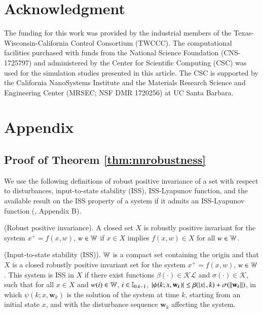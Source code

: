 \documentclass[preprint,5p, twocolumn, authoryear]{elsarticle}
\begin{document}
\section*{Acknowledgment}
The funding for this work was provided by the industrial members of the
Texas-Wisconsin-California Control Consortium (TWCCC). The computational
facilities purchased with funds from the National Science Foundation
(CNS-1725797) and administered by the Center for Scientific Computing (CSC) was
used for the simulation studies presented in this article. The CSC is supported
by the California NanoSystems Institute and the Materials Research Science and
Engineering Center (MRSEC; NSF DMR 1720256) at UC Santa Barbara.




\section*{Appendix}
\renewcommand{\thesubsection}{\Alph{subsection}}

\subsection{Proof of Theorem \ref{thm:nnrobustness}} \label{app:theorem1}

We use the following definitions of robust positive invariance of a set with
respect to disturbances, input-to-state stability (ISS), ISS-Lyapunov function,
and the available result on the ISS property of a system if it admits an
ISS-Lyapunov function (\cite*{jiang:wang:2001, rawlings:mayne:diehl:2017},
Appendix B).

\begin{definition} \label{def:robust_pos_invariance} (Robust positive
invariance). A closed set $X$ is robustly positive invariant for the system $x^+
= f(x, w)$, $w \in \mathbb{W}$ if $x \in X$ implies $f(x, w) \in X$ for all $w \in
\mathbb{W}$.
\end{definition}

\begin{definition} \label{def:iss} (Input-to-state stability (ISS)). $\mathbb{W}$ is a
compact set containing the origin and that $X$ is a closed robustly positive
invariant set for the system $x^+ = f(x, w)$, $w \in \mathbb{W}$. This system is ISS
in $X$ if there exist functions $\beta(\cdot) \in \mathcal{K}\mathcal{L}$ and
$\sigma(\cdot) \in \mathcal{K}$, such that for all $x \in X$ and $w(i) \in
\mathbb{W}$, $i \in \mathbb{I}_{0:k-1}$, $\left| \psi(k; x, \mathbf{w}_k) \right| \leq
\beta(\left| x \right|, k) + \sigma(\left| \left| \mathbf{w}_k \right| \right|)$, in which $\psi(k; x,
\mathbf{w}_k)$ is the solution of the system at time $k$, starting from an
initial state $x$, and with the disturbance sequence $\mathbf{w}_k$ affecting
the system.
\end{definition}
\end{document}
